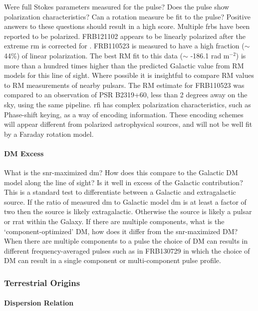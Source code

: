 \documentclass[a4paper,fleqn,usenatbib]{mnras}
\begin{document}
Were full Stokes parameters measured for the pulse? Does the pulse show
polarization characteristics? Can a rotation measure be fit to the pulse?
Positive answers to these questions should result in a high score.  Multiple
\glspl{frb} have been reported to be polarized.  FRB121102 appears to be
linearly polarized after the extreme \gls{rm} is corrected for
\citep{2018Natur.553..182M}. FRB110523 is measured to have a high fraction
($\sim$ 44\%) of linear polarization. The best RM fit to this data ($\sim$
-186.1 rad m$^{-2}$) is more than a hundred times higher than the predicted
Galactic value from RM models for this line of sight. Where possible it is
insightful to compare RM values to RM measurements of nearby pulsars. The RM
estimate for FRB110523 was compared to an observation of PSR B2319+60, less than
2 degrees away on the sky, using the same pipeline.  \gls{rfi} has complex
polarization characteristics, such as Phase-shift keying, as a way of encoding
information.  These encoding schemes will appear different from polarized
astrophysical sources, and will not be well fit by a Faraday rotation model.

\paragraph{DM Excess}

What is the \gls{snr}-maximized \gls{dm}? How does this compare to the Galactic
DM model along the line of sight? Is it well in excess of the Galactic
contribution? This is a standard test to differentiate between a Galactic and
extragalactic source. If the ratio of measured \gls{dm} to Galactic model
\gls{dm} is at least a factor of two then the source is likely extragalactic.
Otherwise the source is likely a pulsar or \gls{rrat} within the Galaxy.  If
there are multiple components, what is the `component-optimized' DM, how does it
differ from the \gls{snr}-maximized DM? When there are multiple components to a
pulse the choice of DM can results in different frequency-averaged pulses such
as in FRB130729 in which the choice of DM can result in a single component or
multi-component pulse profile. 

\subsubsection{Terrestrial Origins}

\paragraph{Dispersion Relation}
\end{document}
